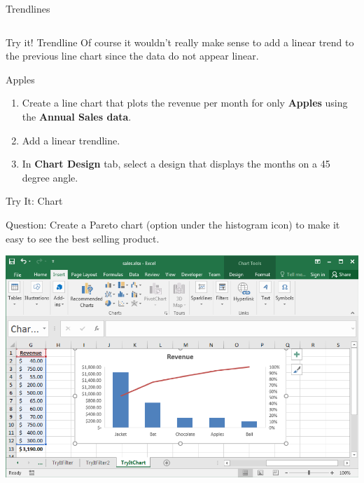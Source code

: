 \documentclass[xcolor=svgnames, handout]{beamer}
\newcommand{\red}[1]{\textcolor{red}{#1}}
\begin{document}
\begin{frame}{Trendlines}
\begin{columns}[T]
\begin{column}{.48\textwidth}
\begin{center}
 \end{center}
\end{column}%
\end{columns}
\end{frame}

\begin{frame}{Try it! Trendline}
Of course it wouldn't really make sense to add a linear trend to the previous line chart since the data do not appear linear.
\begin{exampleblock}{Apples}
\begin{enumerate}
\item Create a line chart that plots the revenue per month for only {\bf Apples} using the {\bf Annual Sales data}. 
\item Add a linear trendline.
\item In {\bf Chart Design} tab, select a design that displays the months on a 45 degree angle. 
\end{enumerate}
\end{exampleblock}
\end{frame}


\begin{frame}{Try It: Chart}
\begin{exampleblock}
{Question:}  Create a Pareto chart (option under the histogram icon) to make it easy to see the best selling product.
\end{exampleblock}
 \begin{center}
        \includegraphics[width=.8\textwidth]{pareto}
 \end{center}
\end{frame}
\end{document}
